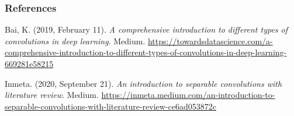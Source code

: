\begin{vbframe}
\frametitle{References}
\footnotesize{
\begin{thebibliography}{99}

Bai, K. (2019, February 11). \textit{A comprehensive introduction to different types of convolutions in deep learning}. Medium. \url{https://towardsdatascience.com/a-comprehensive-introduction-to-different-types-of-convolutions-in-deep-learning-669281e58215}

Inmeta. (2020, September 21). \textit{An introduction to separable convolutions with literature review}. Medium. \url{https://inmeta.medium.com/an-introduction-to-separable-convolutions-with-literature-review-ce6ad053872c}



\end{thebibliography}}
\end{vbframe}
